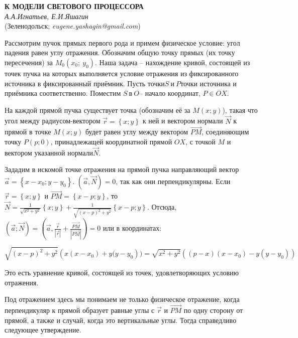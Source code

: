 \begin{center}{ \bf К МОДЕЛИ СВЕТОВОГО ПРОЦЕССОРА}\\
{\it А.А.Игнатьев, Е.И.Яшагин} \\
(Зеленодольск; {\it eugene.yashagin@gmail.com})
\end{center}

Рассмотрим пучок прямых первого рода и примем физическое условие: угол падения равен углу отражения. Обозначим общую точку прямых (их точку пересечения) за $M_0\left(x_0;\ y_0\right)$. Наша задача -- нахождение кривой, состоящей из точек пучка на которых выполняется условие отражения из фиксированного источника в фиксированный приёмник. Пусть точки$S\ и\ P$точки источника и приёмника соответственно. Поместим $S\ в\ O$--  начало координат, $P\in OX$.

На каждой прямой пучка существует точка (обозначим её за $M\left(x;y\right)$), такая что угол между радиусом-вектором $\overrightarrow{r}=\left\{x;y\right\}$ к ней и вектором нормали $\overrightarrow{N}$ к прямой в точке $M\left(x;y\right)$ будет равен углу между вектором $\overrightarrow{PM}$, соединяющим точку $P\left(p;0\right)$, принадлежащей координатной прямой $OX$, с точкой $M$ и вектором указанной нормали$\overrightarrow{N}$.

Зададим в искомой точке отражения на прямой пучка направляющий вектор $\overrightarrow{a}=\left\{x-x_0;y-y_0\right\}$. $\left(\overrightarrow{a},\overrightarrow{N}\right)=0$, так как они перпендикулярны. Если $\overrightarrow{r}=\left\{x;y\right\}$ и $\overrightarrow{PM}=\left\{x-p;y\right\}$, то  $\overrightarrow{N}=\frac{1}{\sqrt{x^2+y^2}}\left\{x;y\right\}+\frac{1}{\sqrt{{\left(x-p\right)}^2+y^2}}\left\{x-p;y\right\}$. Отсюда, $\left(\overrightarrow{a};\overrightarrow{N}\right)=\left(\overrightarrow{a},\frac{\overrightarrow{r}}{\left|\overrightarrow{r}\right|}+\frac{\overrightarrow{PM}}{\left|\overrightarrow{PM}\right|}\right)=0$ или в координатах:

\[\sqrt{{\left(x-p\right)}^2+y^2}\left(x(x-x_0)+y(y-y_0\right))=\sqrt{x^2+y^2}\left(\left(p-x\right)\left(x-x_0\right)-y\left(y-y_0\right)\right)\]

Это есть уравнение кривой, состоящей из точек, удовлетворяющих условию отражения.

Под отражением здесь мы понимаем не только физическое отражение, когда перпендикуляр к прямой образует равные углы с $\overrightarrow{r}$ и $\overrightarrow{PM}$ по одну сторону от прямой, а также и случай, когда это вертикальные углы. Тогда справедливо следующее утверждение.

